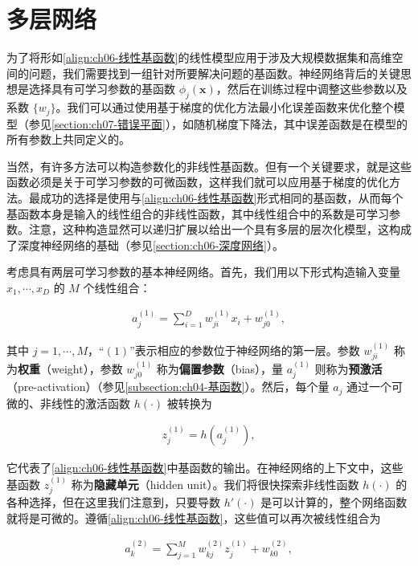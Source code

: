 \documentclass[../../main.tex]{subfiles}
\begin{document}
\section{多层网络}\label{section:ch06-多层网络}

为了将形如\eqref{align:ch06-线性基函数}的线性模型应用于涉及大规模数据集和高维空间的问题，我们需要找到一组针对所要解决问题的基函数。神经网络背后的关键思想是选择具有可学习参数的基函数 $\phi_j(\boldsymbol{x})$，然后在训练过程中调整这些参数以及系数 $\{w_j\}$。我们可以通过使用基于梯度的优化方法最小化误差函数来优化整个模型（参见\cref{section:ch07-错误平面}），如随机梯度下降法，其中误差函数是在模型的所有参数上共同定义的。

当然，有许多方法可以构造参数化的非线性基函数。但有一个关键要求，就是这些函数必须是关于可学习参数的可微函数，这样我们就可以应用基于梯度的优化方法。最成功的选择是使用与\eqref{align:ch06-线性基函数}形式相同的基函数，从而每个基函数本身是输入的线性组合的非线性函数，其中线性组合中的系数是可学习参数。注意，这种构造显然可以递归扩展以给出一个具有多层的层次化模型，这构成了深度神经网络的基础（参见\cref{section:ch06-深度网络}）。

考虑具有两层可学习参数的基本神经网络。首先，我们用以下形式构造输入变量 $x_1,\cdots,x_D$ 的 $M$ 个线性组合：

\begin{align}
a_j^{(1)}=\sum_{i=1}^{D}w_{ji}^{(1)}x_i+w_{j0}^{(1)},
\label{align:ch06-第一层预激活}
\end{align}

其中 $j=1,\cdots,M$，“$(1)$”表示相应的参数位于神经网络的第一层。参数 $w_{ji}^{(1)}$ 称为\textbf{权重}（weight），参数 $w_{j0}^{(1)}$ 称为\textbf{偏置参数}（bias），量 $a_j^{(1)}$ 则称为\textbf{预激活}（pre-activation）（参见\cref{subsection:ch04-基函数}）。然后，每个量 $a_j$ 通过一个可微的、非线性的激活函数 $h(\cdot)$ 被转换为

\begin{align}
z_j^{(1)}=h\!\left(a_j^{(1)}\right),
\label{align:ch06-隐藏单元}
\end{align}

它代表了\eqref{align:ch06-线性基函数}中基函数的输出。在神经网络的上下文中，这些基函数 $z_j^{(1)}$ 称为\textbf{隐藏单元}（hidden unit）。我们将很快探索非线性函数 $h(\cdot)$ 的各种选择，但在这里我们注意到，只要导数 $h'(\cdot)$ 是可以计算的，整个网络函数就将是可微的。遵循\eqref{align:ch06-线性基函数}，这些值可以再次被线性组合为

\begin{align}
a_k^{(2)}=\sum_{j=1}^{M}w_{kj}^{(2)}z_j^{(1)}+w_{k0}^{(2)},
\label{align:ch06-第二层预激活}
\end{align}
\end{document}
